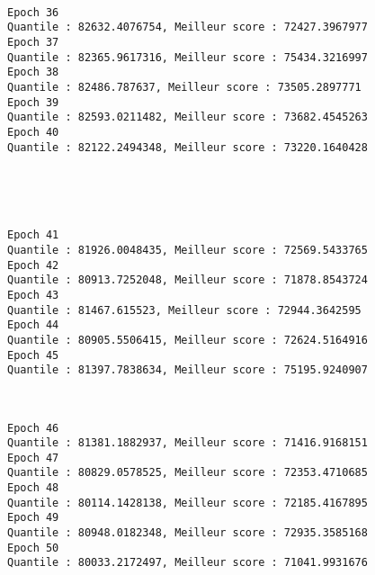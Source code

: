 \documentclass[11pt]{article}
\begin{document}
    \begin{center}
    \end{center}
    { \hspace*{\fill} \\}
    
    \begin{Verbatim}[commandchars=\\\{\}]
Epoch 36
Quantile : 82632.4076754, Meilleur score : 72427.3967977
Epoch 37
Quantile : 82365.9617316, Meilleur score : 75434.3216997
Epoch 38
Quantile : 82486.787637, Meilleur score : 73505.2897771
Epoch 39
Quantile : 82593.0211482, Meilleur score : 73682.4545263
Epoch 40
Quantile : 82122.2494348, Meilleur score : 73220.1640428

    \end{Verbatim}

    \begin{center}
    \end{center}
    { \hspace*{\fill} \\}
    
    \begin{center}
    \end{center}
    { \hspace*{\fill} \\}
    
    \begin{Verbatim}[commandchars=\\\{\}]
Epoch 41
Quantile : 81926.0048435, Meilleur score : 72569.5433765
Epoch 42
Quantile : 80913.7252048, Meilleur score : 71878.8543724
Epoch 43
Quantile : 81467.615523, Meilleur score : 72944.3642595
Epoch 44
Quantile : 80905.5506415, Meilleur score : 72624.5164916
Epoch 45
Quantile : 81397.7838634, Meilleur score : 75195.9240907

    \end{Verbatim}

    \begin{center}
    \end{center}
    { \hspace*{\fill} \\}
    
    \begin{Verbatim}[commandchars=\\\{\}]
Epoch 46
Quantile : 81381.1882937, Meilleur score : 71416.9168151
Epoch 47
Quantile : 80829.0578525, Meilleur score : 72353.4710685
Epoch 48
Quantile : 80114.1428138, Meilleur score : 72185.4167895
Epoch 49
Quantile : 80948.0182348, Meilleur score : 72935.3585168
Epoch 50
Quantile : 80033.2172497, Meilleur score : 71041.9931676

    \end{Verbatim}
\end{document}
